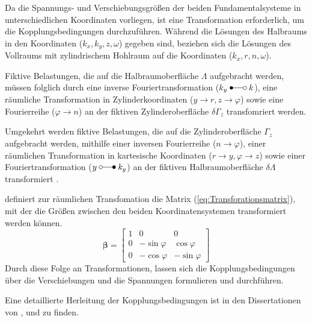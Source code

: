  Da die Spannungs- und Verschiebungsgrößen der beiden Fundamentalsysteme in unterschiedlichen Koordinaten vorliegen, ist eine Transformation erforderlich, um die Kopplungsbedingungen durchzuführen. Während die Lösungen des Halbraums in den Koordinaten ($k_x, k_y,z,\omega$) gegeben sind, beziehen sich die Lösungen des Vollraums mit zylindrischem Hohlraum auf die Koordinaten ($k_x, r,n,\omega$).
  
 Fiktive Belastungen, die auf die Halbraumoberfläche $\Lambda$ aufgebracht werden, müssen folglich durch eine inverse Fouriertransformation ($k_y\mapfrom k$), eine räumliche Transformation in Zylinderkoordinaten ($y \rightarrow r, z \rightarrow \varphi$) sowie eine Fourierreihe ($\varphi \rightarrow n$) an der fiktiven Zylinderoberfläche $\delta\Gamma_z$ transfomriert werden.

Umgekehrt werden fiktive Belastungen, die auf die Zylinderoberfläche $\Gamma_z$ aufgebracht werden, mithilfe einer inversen Fourierreihe ($n \rightarrow \varphi$), einer räumlichen Transformation in kartesische Koordinaten ($r \rightarrow y, \varphi \rightarrow z$) sowie einer Fouriertransformation ($y \mapto k_y$) an der fiktiven Halbraumoberfläche $\delta\Lambda$ transformiert \citep{Freisinger2022}.


\cite{Fruehe2010} definiert zur räumlichen Transfomation die Matrix (\ref{eq:Transforationsmatrix}), mit der die Größen zwischen den beiden Koordinatensystemen transformiert werden können.
\begin{equation} \label{eq:Transforationsmatrix}
\boldsymbol\beta
= \begin{bmatrix}
	1 & 0 & 0 \\
	0 & -\sin\varphi & \cos\varphi \\
	0 & -\cos\varphi & -\sin\varphi
\end{bmatrix}
\end{equation}
Durch diese Folge an Transformationen, lassen sich die Kopplungsbedingungen über die Verschiebungen und die Spannungen formulieren und durchführen.


Eine detaillierte Herleitung der Kopplungsbedingungen ist in den Dissertationen von \cite{Fruehe2010}, \cite{Hackenberg2016} und \cite{Freisinger2022} zu finden.





